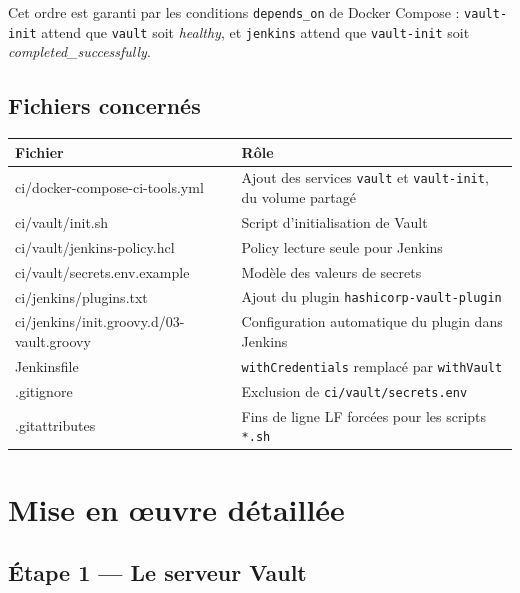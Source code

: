 \documentclass[11pt,a4paper]{article}
\begin{document}
Cet ordre est garanti par les conditions \texttt{depends\_on} de Docker Compose :
\texttt{vault-init} attend que \texttt{vault} soit \emph{healthy}, et \texttt{jenkins}
attend que \texttt{vault-init} soit \emph{completed\_successfully}.

\subsection{Fichiers concernés}

\begin{center}
\begin{tabularx}{\linewidth}{>{\ttfamily\small}l X}
\toprule
\textrm{\textbf{Fichier}} & \textbf{Rôle} \\
\midrule
ci/docker-compose-ci-tools.yml          & Ajout des services \texttt{vault} et \texttt{vault-init}, du volume partagé \\
ci/vault/init.sh                        & Script d'initialisation de Vault \\
ci/vault/jenkins-policy.hcl             & Policy lecture seule pour Jenkins \\
ci/vault/secrets.env.example            & Modèle des valeurs de secrets \\
ci/jenkins/plugins.txt                  & Ajout du plugin \texttt{hashicorp-vault-plugin} \\
ci/jenkins/init.groovy.d/03-vault.groovy & Configuration automatique du plugin dans Jenkins \\
Jenkinsfile                             & \texttt{withCredentials} remplacé par \texttt{withVault} \\
.gitignore                              & Exclusion de \texttt{ci/vault/secrets.env} \\
.gitattributes                          & Fins de ligne LF forcées pour les scripts \texttt{*.sh} \\
\bottomrule
\end{tabularx}
\end{center}

\section{Mise en œuvre détaillée}

\subsection{Étape 1 — Le serveur Vault}
\end{document}
